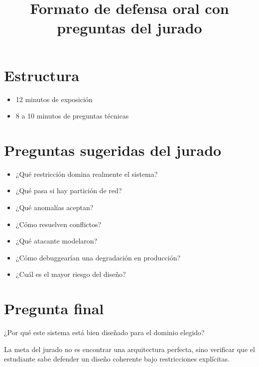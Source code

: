 \documentclass{ua-engineering-v6-article}
\title{Formato de defensa oral con preguntas del jurado}
\author{\UAProfessor}
\date{\UADate}
\begin{document}
\maketitle

\section{Estructura}
\begin{itemize}
\item 12 minutos de exposición
\item 8 a 10 minutos de preguntas técnicas
\end{itemize}

\section{Preguntas sugeridas del jurado}
\begin{itemize}
\item ¿Qué restricción domina realmente el sistema?
\item ¿Qué pasa si hay partición de red?
\item ¿Qué anomalías aceptan?
\item ¿Cómo resuelven conflictos?
\item ¿Qué atacante modelaron?
\item ¿Cómo debuggearían una degradación en producción?
\item ¿Cuál es el mayor riesgo del diseño?
\end{itemize}

\section{Pregunta final}
¿Por qué este sistema está bien diseñado para el dominio elegido?

\begin{uakeybox}
La meta del jurado no es encontrar una arquitectura perfecta, sino verificar que el estudiante sabe defender un diseño coherente bajo restricciones explícitas.
\end{uakeybox}
\end{document}
